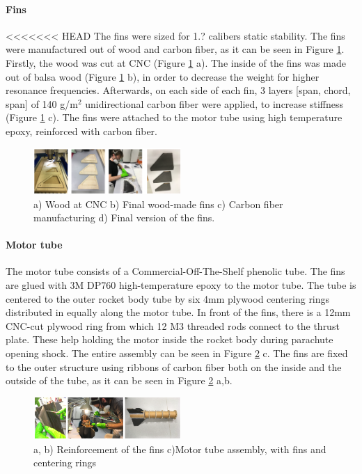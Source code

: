\paragraph{Fins}
\hfill \break
<<<<<<< HEAD
    The fins were sized for 1.? calibers static stability. %
    The fins were manufactured out of wood and carbon fiber, as it can be seen in Figure \ref{f:fins}. Firstly, the wood was cut at CNC (Figure \ref{f:fins} a). The inside of the fins was made out of balsa wood (Figure \ref{f:fins} b), in order to decrease the weight for higher resonance frequencies. Afterwards, on each side of each fin, 3 layers [span, chord, span] of 140 g/m$^2$ unidirectional carbon fiber were applied, to increase stiffness (Figure \ref{f:fins} c). The fins were attached to the motor tube using high temperature epoxy, reinforced with carbon fiber.

    \begin{figure}[h!]
        \centering
        \includegraphics[width=0.5\textwidth]{img/fins.png}
        \caption{a) Wood at CNC b) Final wood-made fins c) Carbon fiber manufacturing d) Final version of the fins.}
        \label{f:fins}
    \end{figure}


\paragraph{Motor tube}
\hfill \break
The motor tube consists of a Commercial-Off-The-Shelf phenolic tube. The fins are glued with 3M DP760 high-temperature epoxy to the motor tube. The tube is centered to the outer rocket body tube by six 4mm plywood centering rings distributed in equally along the motor tube.
In front of the fins, there is a 12mm CNC-cut plywood ring from which 12 M3 threaded rods connect to the thrust plate. These help holding the motor inside the rocket body during parachute opening shock.
The entire assembly can be seen in Figure \ref{f:reinforcement} c. The fins are fixed to the outer structure using ribbons of carbon fiber both on the inside and the outside of the tube, as it can be seen in Figure \ref{f:reinforcement} a,b.

  \begin{figure}[h!]
\centering
\includegraphics[width=0.5\textwidth]{img/fins_glue.png}
\caption{a, b) Reinforcement of the fins c)Motor tube assembly, with fins and centering rings}
\label{f:reinforcement}
\end{figure}


